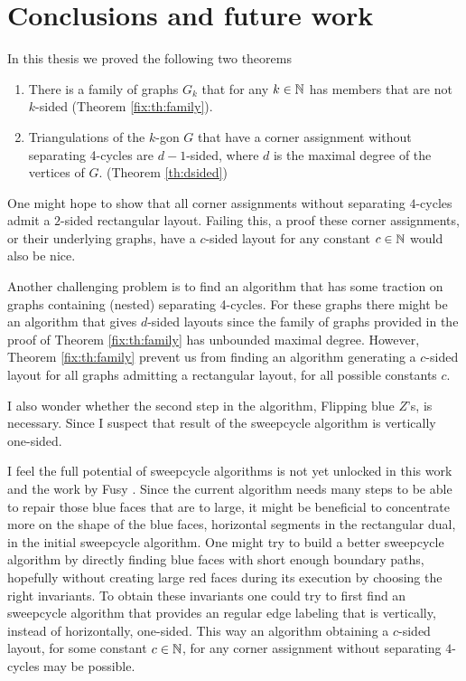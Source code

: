 
\thispagestyle{plain}
\section{Conclusions and future work}

In this thesis we proved the following two theorems

\begin{enumerate}
  \item There is a family of graphs $G_k$ that for any $k \in \mathbb{N}$ has members that are not $k$-sided (Theorem \ref{fix:th:family}).
  \item Triangulations of the $k$-gon $G$ that have a corner assignment without separating 4-cycles are $d-1$-sided, where $d$ is the maximal degree of the vertices of $G$. (Theorem \ref{th:dsided})
\end{enumerate}

One might hope to show that all corner assignments without separating $4$-cycles admit a $2$-sided rectangular layout. Failing this, a proof these corner assignments, or their underlying graphs, have a $c$-sided layout for any constant $c\in \mathbb{N}$ would also be nice.

Another challenging problem is to find an algorithm that has some traction on graphs containing (nested) separating 4-cycles.
For these graphs there might be an algorithm that gives $d$-sided layouts since the family of graphs provided in the proof of Theorem \ref{fix:th:family} has unbounded maximal degree.
However, Theorem \ref{fix:th:family} prevent us from finding an algorithm generating a $c$-sided layout for all graphs admitting a rectangular layout, for all possible constants $c$.

I also wonder whether the second step in the algorithm, Flipping blue $Z$'s, is necessary.
Since I suspect that result of the sweepcycle algorithm is vertically one-sided.

I feel the full potential of sweepcycle algorithms is not yet unlocked in this work and the work by Fusy \cite{Fusy2006}.
Since the current algorithm needs many steps to be able to repair those blue faces that are to large, it might be beneficial to concentrate more on the shape of the blue faces, horizontal segments in the rectangular dual, in the initial sweepcycle algorithm.
One might try to build a better sweepcycle algorithm by directly finding blue faces with short enough boundary paths, hopefully without creating large red faces during its execution by choosing the right invariants.
To obtain these invariants one could try to first find an sweepcycle algorithm that provides an regular edge labeling that is vertically, instead of horizontally, one-sided.
This way an algorithm obtaining a $c$-sided layout, for some constant $c \in \mathbb{N}$, for any corner assignment without separating $4$-cycles may be possible.

